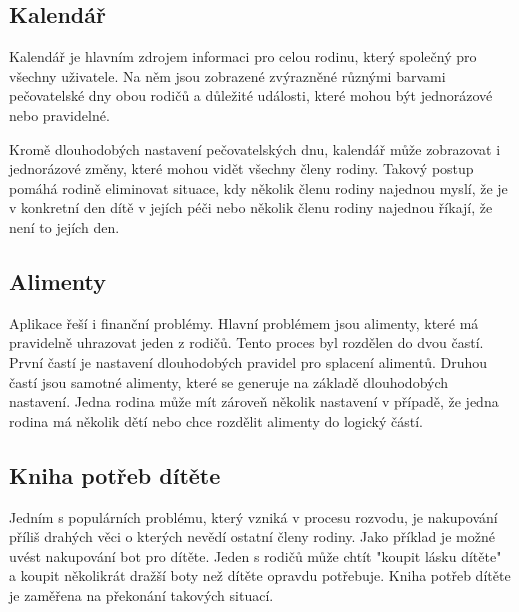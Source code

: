     \subsection{Kalendář}    
        Kalendář je hlavním zdrojem informaci pro celou rodinu, který společný pro všechny uživatele. Na něm jsou zobrazené zvýrazněné různými barvami pečovatelské dny obou rodičů a důležité události, které mohou být jednorázové nebo pravidelné. 
        
        Kromě dlouhodobých nastavení pečovatelských dnu, kalendář může zobrazovat i jednorázové změny, které mohou vidět všechny členy rodiny. Takový postup pomáhá rodině eliminovat situace, kdy několik členu rodiny najednou myslí, že je v konkretní den dítě v jejích péči nebo několik členu rodiny najednou říkají, že není to jejích den.  
    \subsection{Alimenty}    
        Aplikace řeší i finanční problémy. Hlavní problémem jsou alimenty, které má pravidelně uhrazovat jeden z rodičů. Tento proces byl rozdělen do dvou častí. První častí je nastavení dlouhodobých pravidel pro splacení alimentů. Druhou častí jsou samotné alimenty, které se generuje na základě dlouhodobých nastavení. Jedna rodina může mít zároveň několik nastavení v případě, že jedna rodina má několik dětí nebo chce rozdělit alimenty do logický částí.
    \subsection{Kniha potřeb dítěte}
    
        Jedním s populárních problému, který vzniká v procesu rozvodu, je nakupování příliš drahých věci o kterých nevědí ostatní členy rodiny. Jako příklad je možné uvést nakupování bot pro dítěte. Jeden s rodičů může chtít "koupit lásku dítěte" a koupit několikrát dražší boty než dítěte opravdu potřebuje. Kniha potřeb dítěte je zaměřena na překonání takových situací.
        
